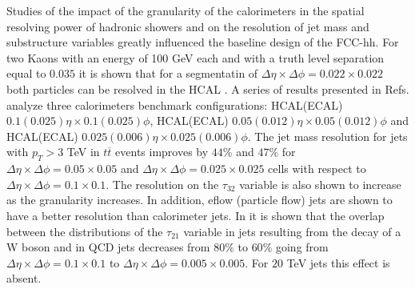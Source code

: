Studies of the impact of the granularity of the calorimeters in the spatial resolving power of hadronic showers and on the resolution of jet mass and substructure variables greatly influenced the baseline design of the FCC-hh. For two Kaons with an energy of 100 GeV each and with a truth level separation equal to $0.035$ it is shown that for a segmentatin of $\Delta\eta\times\Delta\phi=0.022\times0.022$ both particles can be resolved in the HCAL \cite{FCC_HCALgran_doubleK}. A series of results presented in Refs. \cite{BOOST2017,FCCweek2015,FCCweek2016} analyze three calorimeters benchmark configurations: HCAL(ECAL) $0.1(0.025) \eta\times0.1(0.025)\phi$, HCAL(ECAL) $0.05(0.012) \eta\times0.05(0.012)\phi$ and HCAL(ECAL) $0.025(0.006) \eta \times 0.025(0.006)\phi$. The jet mass resolution for jets with $p_T>3$ TeV in $t\overline{t}$ events improves by $44 \%$ and $47 \%$ for $\Delta\eta\times\Delta\phi = 0.05 \times 0.05$ and $\Delta\eta\times\Delta\phi = 0.025 \times 0.025$ cells with respect to $\Delta\eta\times\Delta\phi = 0.1\times0.1$. The resolution on the $\tau_{32}$ variable is also shown to increase as the granularity increases. In addition, eflow (particle flow) jets are shown to have a better resolution than calorimeter jets. In \cite{BOOST2017} it is shown that the overlap between the distributions of the $\tau_{21}$ variable in jets resulting from the decay of a W boson and in QCD jets decreases from $80\%$ to $60\%$ going from $\Delta\eta\times\Delta\phi = 0.1 \times 0.1$ to $\Delta\eta\times\Delta\phi = 0.005 \times 0.005$. For $20$ TeV jets this effect is absent.



